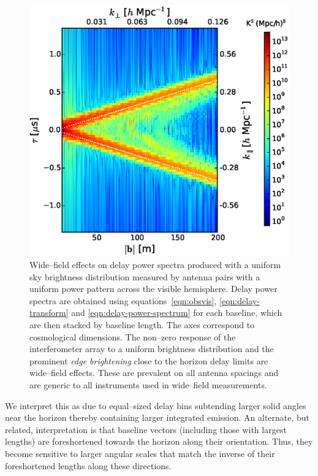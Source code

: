\documentclass[preprint2,iop,numberedappendix,twocolappendix,appendixfloats]{emulateapj}
\begin{document}
\begin{figure}[htb]
\centering
\includegraphics[width=\linewidth]{figure2.eps}
\caption{Wide--field effects on delay power spectra produced with a uniform sky brightness distribution measured by antenna pairs with a uniform power pattern across the visible hemisphere. Delay power spectra are obtained using equations~\ref{eqn:obsvis}, \ref{eqn:delay-transform} and \ref{eqn:delay-power-spectrum} for each baseline, which are then stacked by baseline length. The axes correspond to cosmological dimensions. The non--zero response of the interferometer array to a uniform brightness distribution and the prominent {\it edge brightening} close to the horizon delay limits are wide--field effects. These are prevalent on all antenna spacings and are generic to all instruments used in wide--field measurements. \label{fig:usm}}
\end{figure}

We interpret this as due to equal--sized delay bins subtending larger solid angles near the horizon thereby containing larger integrated emission. An alternate, but related, interpretation is that baseline vectors (including those with largest lengths) are foreshortened towards the horizon along their orientation. Thus, they become sensitive to larger angular scales that match the inverse of their foreshortened lengths along these directions.
\end{document}
